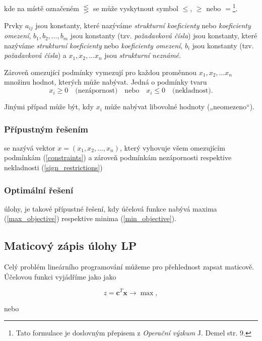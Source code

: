 kde na místě označeném $\lesseqgtr$ se může vyskytnout symbol $\leq$, $\geq$ nebo $=$\footnote{Tato formulace je doslovným přepisem z \textit{Operační výzkum} J. Demel \cite{demel} str. 9.}.

Prvky $a_{ij}$ jsou konstanty, které nazýváme \textit{strukturní koeficienty} nebo \textit{koeficienty omezení},
$b_1, b_2, \ldots, b_m$
jsou konstanty (tzv. \textit{požadavková čísla})
jsou konstanty, které nazýváme \textit{strukturní koeficienty} nebo \textit{koeficienty omezení}, $b_i$ jsou konstanty (tzv. \textit{požadavková čísla})
a $x_1, x_2, \ldots x_n$ jsou \textit{strukturní neznámé}.

Zároveň omezující podmínky vymezují pro každou proměnnou $x_1, x_2, \ldots x_n$ množinu hodnot, kterých může nabývat. 
Jedná o podmínky tvaru
\begin{equation} \label{sign_restrictions}
    x_i \geq 0 \quad \text{(nezápornost)} \quad \text{nebo} \quad x_i \leq 0 \quad \text{(nekladnost)}.
\end{equation}

Jinými případ může být, kdy $x_i$ může nabývat libovolné hodnoty („neomezeno“).

\subsubsection{Přípustným řešením} se nazývá vektor $x = (x_1, x_2, \ldots, x_n)$, který vyhovuje všem omezujícím podmínkám (\ref{constraints}) a zároveň podmínkám nezápornosti respektive nekladnosti (\ref{sign_restrictions})

\subsubsection{Optimální řešení} úlohy, je takové přípustné řešení, kdy účelová funkce nabývá maxima (\ref{max_objective}) respektive minima (\ref{min_objective}).

\subsection{Maticový zápis úlohy LP}

Celý problém lineárního programování můžeme pro přehlednost zapsat maticově.
Účelovou funkci vyjádříme jako
jako

\begin{equation}
    z = \bm{c}^T\bm{x} \rightarrow \max,
\end{equation}

nebo

